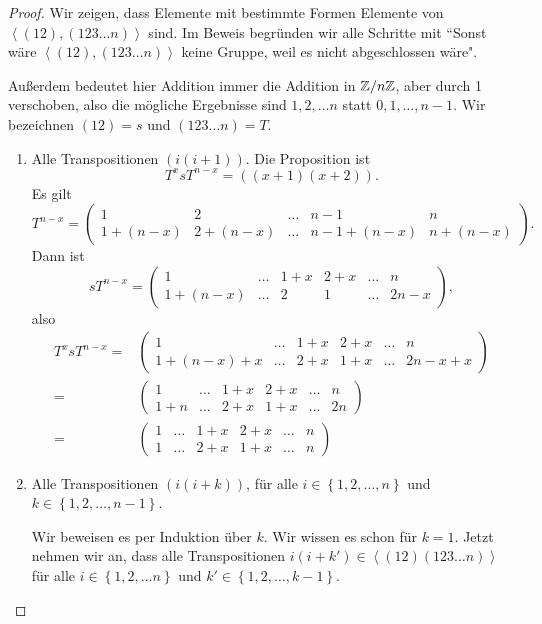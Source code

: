 \begin{proof}
	Wir zeigen, dass Elemente mit bestimmte Formen Elemente von $\left<(12),(123\dots n) \right>$ sind. Im Beweis begründen wir alle Schritte mit ``Sonst wäre $\left<(12),(123\dots n) \right>$ keine Gruppe, weil es nicht abgeschlossen wäre".

	Außerdem bedeutet hier Addition immer die Addition in $\mathbb{Z} / n \mathbb{Z}$, aber durch 1 verschoben, also die mögliche Ergebnisse sind $1,2,\dots n$ statt $0,1,\dots, n-1$. Wir bezeichnen $(12)=s$ und $(123\dots n)=T$. 
	\begin{enumerate}[label=(\roman*)]
		\item Alle Transpositionen $(i(i+1))$. Die Proposition ist
			\[
				T^{x}sT^{n-x}=((x+1)(x+2))
			.\] 
			Es gilt
			\[
				T^{n-x}=\begin{pmatrix} 1 & 2 & \dots & n-1 & n \\ 1+(n-x) & 2+(n-x) & \dots & n-1+(n-x) & n+(n-x) \end{pmatrix} 
			.\]
			Dann ist
			\[
				sT^{n-x}=\begin{pmatrix} 1 & \dots & 1+x & 2 + x & \dots & n\\
				1+(n-x) & \dots & 2 & 1 & \dots & 2n-x\end{pmatrix} 
			,\] 
			also
			\begin{align*}
				T^xsT^{n-x}=& \begin{pmatrix} 1 & \dots & 1+x & 2+x & \dots & n \\ 1+(n-x)+x & \dots & 2+x & 1+x & \dots & 2n-x+x \end{pmatrix} \\
				=& \begin{pmatrix}  1 & \dots & 1+x & 2+x & \dots & n \\ 1 + n & \dots & 2 + x & 1 + x & \dots & 2n \end{pmatrix} \\
				=& \begin{pmatrix} 1 & \dots & 1+x & 2+x & \dots & n \\ 1 & \dots & 2+x & 1+x & \dots & n \end{pmatrix} 
			\end{align*}
		\item Alle Transpositionen $(i(i+k))$, f\"{u}r alle $i\in \left\{ 1,2,\dots, n \right\} $ und $k\in \left\{ 1,2,\dots,n-1 \right\} $.

			Wir beweisen es per Induktion über $k$. Wir wissen es schon f\"{u}r $k=1$. Jetzt nehmen wir an, dass alle Transpositionen $i(i+k')\in \left<(12)(123\dots n) \right>$ f\"{u}r alle $i\in \left\{ 1,2,\dots n \right\} $ und $k'\in \left\{ 1,2,\dots, k-1 \right\} $.


\end{enumerate}
\end{proof}
